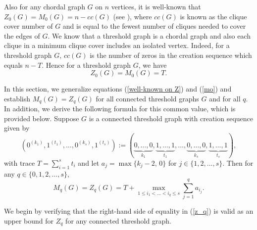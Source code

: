 \documentclass[3p,times,12pt]{article}
\begin{document}
 Also for any chordal graph $G$ on $n$ vertices, it is well-known that $Z_0(G)=M_0(G)=n-cc(G)$ (see \cite{barioli2013parameters}), where $cc(G)$ is known as the clique cover number of $G$ and is equal to the fewest number of cliques needed to cover the edges of $G$. We know that a threshold graph is a chordal graph and also each clique in a minimum clique cover includes an isolated vertex. Indeed, for a threshold graph $G$,  $cc(G)$ is the number of zeros in the creation sequence which equals $n-T$. Hence for a threshold graph $G$, we have 
 \begin{equation}Z_0(G)=M_0(G)=T. \label{mo} \end{equation}
 
 In this section, we generalize equations (\ref{well-known on Z}) and (\ref{mo}) and establish $M_q(G)=Z_q(G)$ for all connected threshold graphs $G$ and for all $q$. In addition, we derive the following formula for this common value, which is provided below.
Suppose $G$ is a connected threshold graph with creation sequence given by 
\[
(0^{(k_1)}, 1^{(t_1)}, \ldots,0^{(k_s)}, 1^{(t_s)}):=
(\underbrace{0, \ldots, 0}_{k_1},\underbrace{1, \ldots, 1}_{t_1}, \ldots,  \underbrace{0, \ldots, 0}_{k_s}, \underbrace{1, \ldots, 1}_{t_s}),\]
 with trace $T=\sum_{i=1}^s t_i$ and let $a_j=\max\{k_j-2,\,0\}$ for $j\in \{1,2,\ldots,s\}$. Then for any 
$q\in \{0,1,2,\ldots,s\}$, 
 \begin{equation}\label{z_q}
M_q(G)= Z_q(G)=T+\max_{1 \le i_1<\ldots<i_q \le s} \sum_{j=1}^q a_{i_j}.
 \end{equation}

We begin by verifying that the right-hand side of equality in (\ref{z_q}) is valid as an upper bound for $Z_q$ for any connected  threshold graph. 
\end{document}
